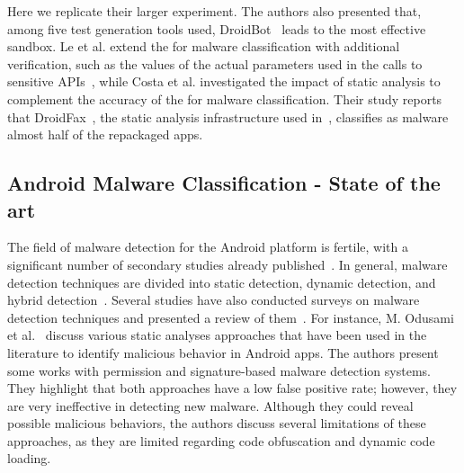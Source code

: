 Here we replicate their larger experiment. 
The authors also presented that, among five test generation tools used, DroidBot~\cite{DBLP:conf/icse/LiYGC17} leads to the most effective sandbox.
Le et al. extend the \mas for malware classification with additional verification,
such as the values of the actual parameters used in the
calls to sensitive APIs~\cite{DBLP:conf/iceccs/LeB0GL18}, while
Costa et al.\cite{DBLP:journals/jss/CostaMMSSBNR22} investigated the impact of static analysis to complement the accuracy of the \mas
for malware classification. Their study reports that DroidFax~\cite{DBLP:conf/icsm/CaiR17a}, the static analysis infrastructure used in~\cite{DBLP:conf/wcre/BaoLL18}, classifies as malware almost half of the repackaged apps.


\subsection{Android Malware Classification - State of the art}

The field of malware detection for the Android platform is fertile, with a significant number of secondary studies already published~\cite{DBLP:conf/eann/SerajPP22,DBLP:conf/icsoft/LekssaysFA20,DBLP:journals/access/WeiLWZZY17,DBLP:conf/codaspy/ZhouZJN12}. In general, malware detection techniques are divided into static detection, dynamic detection, and hybrid detection~\cite{choudhary2018haamd}. Several studies have also conducted surveys on malware detection techniques and presented a review of them~\cite{DBLP:journals/access/LiuXXZSL20,DBLP:journals/csur/TamFASC17,DBLP:conf/icai2/OdusamiAMSDM18}. For instance, M. Odusami et al.~\cite{DBLP:conf/icai2/OdusamiAMSDM18} discuss various static analyses approaches that have been used in the literature to identify malicious behavior in Android apps. The authors present some works with permission and signature-based malware detection systems. They highlight that both approaches have a low false positive rate; however, they are very ineffective in detecting new malware. Although they could reveal possible malicious behaviors, the authors discuss several limitations of these approaches, as they are limited regarding code obfuscation and dynamic code loading.

